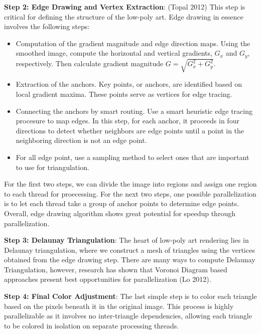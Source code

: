 \documentclass[12pt]{article}
\theoremstyle{definition}
\theoremstyle{plain}
\begin{document}
\begin{description}
\item \textbf{Step 2: Edge Drawing and Vertex Extraction}: (Topal 2012)
This step is critical for defining the structure of the low-poly art. 
Edge drawing in essence involves the following steps:
\begin{itemize}
\item Computation of the gradient magnitude and edge direction maps. Using the
smoothed image, compute the horizontal and vertical gradients, $G_x$ and $G_y$,
respectively. Then calculate gradient magnitude $G=\sqrt{G_x^2 + G_y^2}$.
\item Extraction of the anchors. Key points, or anchors, are identified based on 
local gradient maxima. These points serve as vertices for edge tracing.
\item Connecting the anchors by smart routing. Use a smart heuristic edge tracing
procesure to map edges. In this step, for each anchor, it proceeds in four
directions to detect whether neighbors are edge points until a point in the
neighboring direction is not an edge point. 
\item For all edge point, use a sampling method to select ones that are important to
use for triangulation. 
\end{itemize}
For the first two steps, we can divide the image into regions and assign one region
to each thread for proecessing. For the next two steps, one possible parallelization
is to let each thread take a group of anchor points to determine edge points. 
Overall, edge drawing algorithm shows great potential for speedup through 
parallelization.

\item \textbf{Step 3: Delaunay Triangulation}:
The heart of low-poly art rendering lies in Delaunay triangulation, where we
construct a mesh of triangles using the vertices obtained from the edge drawing step. 
There are many ways to compute Delaunay Triangulation, however, research has shown
that Voronoi Diagram based approaches present best opportunities for parallelization
(Lo 2012).


\item \textbf{Step 4: Final Color Adjustment}:
The last simple step is to color each triangle based on the pixels beneath it in the original image. This process is highly parallelizable as it involves no inter-triangle dependencies, allowing each triangle to be colored in isolation on separate processing threads.
\end{description}
\end{document}
